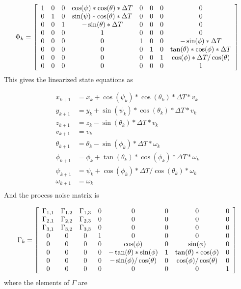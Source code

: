 \begin{align*}
\Phi_k = \left[\begin{array}{c c c c c c c c}
1 & 0 & 0 & \cos(\psi)*\cos(\theta)*\Delta T & 0 & 0 & 0 & 0 \\
0 & 1 & 0 & \sin(\psi)*\cos(\theta)*\Delta T & 0 & 0 & 0 & 0\\
0 & 0 & 1 & -\sin(\theta)*\Delta T & 0 & 0 & 0 & 0\\
0 & 0 & 0 & 1 & 0 & 0 & 0 & 0 \\
0 & 0 & 0 & 0 & 1 & 0 & 0 & -\sin(\phi)*\Delta T \\
0 & 0 & 0 & 0 & 0 & 1 & 0 & \tan(\theta)*\cos(\phi)*\Delta T \\
0 & 0 & 0 & 0 & 0 & 0 & 1 & \cos(\phi)*\Delta T/\cos(\theta) \\
0 & 0 & 0 & 0 & 0 & 0 & 0 & 1
\end{array}\right]
\end{align*}
This gives the linearized state equations as

\begin{align*}
x_{k+1} &= x_k + \cos(\psi_k)*\cos(\theta_k)*\Delta T*v_k \\
y_{k+1} &= y_k + \sin(\psi_k)*\cos(\theta_k)*\Delta T*v_k \\
z_{k+1} &= z_k - \sin(\theta_k)*\Delta T*v_k \\
v_{k+1} &= v_k \\
\theta_{k+1} &= \theta_k - \sin(\phi_k)*\Delta T*\omega_k \\
\phi_{k+1} &= \phi_k + \tan(\theta_k)*\cos(\phi_k)*\Delta T*\omega_k \\
\psi_{k+1} &= \psi_k + \cos(\phi_k)*\Delta T/\cos(\theta_k)*\omega_k \\
\omega_{k+1} &= \omega_k \\
\end{align*}
And the process noise matrix is

\begin{align*}
\Gamma_k = \left[\begin{array}{c c c c c c c c}
\Gamma_{1,1} & \Gamma_{1,2} & \Gamma_{1,3} & 0 & 0 & 0 & 0 & 0 \\
\Gamma_{2,1} & \Gamma_{2,2} & \Gamma_{2,3} & 0 & 0 & 0 & 0 & 0 \\
\Gamma_{3,1} & \Gamma_{3,2} & \Gamma_{3,3} & 0 & 0 & 0 & 0 & 0 \\
0 & 0 & 0 & 1 & 0 & 0 & 0 & 0 \\
0 & 0 & 0 & 0 & \cos(\phi) & 0 & \sin(\phi) & 0 \\
0 & 0 & 0 & 0 & -\tan(\theta)*\sin(\phi) & 1 & \tan(\theta)*\cos(\phi) & 0 \\
0 & 0 & 0 & 0 & -\sin(\phi) / \cos(\theta) & 0 & \cos(\phi)/\cos(\theta) & 0 \\
0 & 0 & 0 & 0 & 0 & 0 & 0 & 1
\end{array}\right]
\end{align*}
where the elements of $\Gamma$ are

